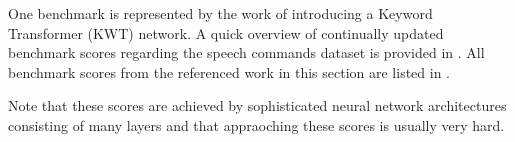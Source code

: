One benchmark is represented by the work of \cite{Berg2021} introducing a Keyword Transformer (KWT) network.
A quick overview of continually updated benchmark scores regarding the speech commands dataset is provided in \cite{PaperswithcodeKWS}.
All benchmark scores from the referenced work in this section are listed in .

Note that these scores are achieved by sophisticated neural network architectures consisting of many layers and that appraoching these scores is usually very hard.